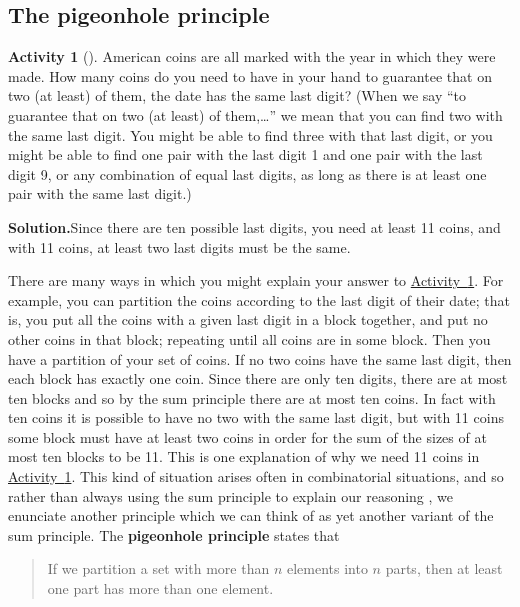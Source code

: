 \documentclass[10pt,]{book}
\newcommand{\terminology}[1]{\textbf{#1}}
\theoremstyle{plain}
\theoremstyle{definition}
\newtheorem{activity}[project]{Activity}
\numberwithin{equation}{chapter}
\begin{document}
\subsection[{The pigeonhole principle}]{The pigeonhole principle}\label{subsection-9}
\begin{activity}[]\label{elevencoins}
American coins are all marked with the year in which they were made. How many coins do you need to have in your hand to guarantee that on two (at least) of them, the date has the same last digit? (When we say ``to guarantee that on two (at least) of them,\dots{}'' we mean that you can find two with the same last digit. You might be able to find three with that last digit, or you might be able to find one pair with the last digit 1 and one pair with the last digit 9, or any combination of equal last digits, as long as there is at least one pair with the same last digit.)%
\par\medskip\noindent%
\textbf{Solution.}\quad Since there are ten possible last digits, you need at least 11 coins, and with 11 coins, at least two last digits must be the same.%
\end{activity}
There are many ways in which you might explain your answer to \hyperref[elevencoins]{Activity~\ref{elevencoins}}. For example, you can partition the coins according to the last digit of their date; that is, you put all the coins with a given last digit in a block together, and put no other coins in that block; repeating until all coins are in some block. Then you have a partition of your set of coins. If no two coins have the same last digit, then each block has exactly one coin. Since there are only ten digits, there are at most ten blocks and so by the sum principle there are at most ten coins. In fact with ten coins it is possible to have no two with the same last digit, but with 11 coins some block must have at least two coins in order for the sum of the sizes of at most ten blocks to be 11. This is one explanation of why we need 11 coins in \hyperref[elevencoins]{Activity~\ref{elevencoins}}. This kind of situation arises often in combinatorial situations, and so rather than always using the sum principle to explain our reasoning , we enunciate another principle which we can think of as yet another variant of the sum principle. The \terminology{pigeonhole principle} states that%
\begin{quote}\hypertarget{blockquote-5}{}
If we partition a set with more than \(n\) elements into \(n\) parts, then at least one part has more than one element.%
\end{quote}
\end{document}
